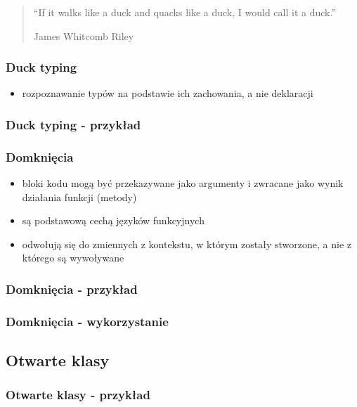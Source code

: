 \documentclass[12t]{beamer}
\begin{document}
\begin{frame}
  \begin{quote}
    “If it walks like a duck and quacks like a duck, I would call it a
    duck.”

    \hfill James Whitcomb Riley
  \end{quote}
\end{frame}

\begin{frame}
  \frametitle{Duck typing}
  \begin{itemize}
  \item rozpoznawanie typów na podstawie ich zachowania, a nie deklaracji
  \end{itemize}
\end{frame}

\begin{frame}
  \frametitle{Duck typing - przykład}
 \begin{footnotesize}
    
  \end{footnotesize}
\end{frame}

\begin{frame}
  \frametitle{Domknięcia}
  \begin{itemize}
  \item bloki kodu mogą być przekazywane jako argumenty i zwracane
    jako wynik działania funkcji (metody)
  \item są podstawową cechą języków funkcyjnych
  \item odwołują się do zmiennych z kontekstu, w którym zostały
    stworzone, a nie z którego są wywoływane
  \end{itemize}
\end{frame}

\begin{frame}
  \frametitle{Domknięcia - przykład}
  
\end{frame}

\begin{frame}
  \frametitle{Domknięcia - wykorzystanie}
  
\end{frame}

\subsection{Otwarte klasy}
\begin{frame}
  \frametitle{Otwarte klasy - przykład}
  
\end{frame}
\end{document}
